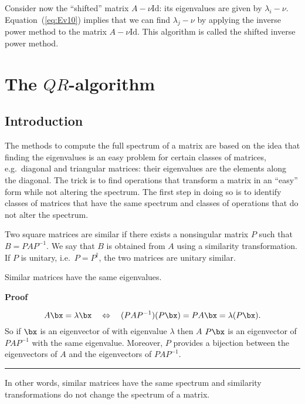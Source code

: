Consider now the ``shifted'' matrix $A - \nu \text{Id}$: its
eigenvalues are given by $\lambda_i - \nu$.  Equation~(\ref{eq:Ev10})
implies that we can find $\lambda_j - \nu$ by applying the inverse
power method to the matrix $A - \nu \text{Id}$.  This algorithm is
called the shifted inverse power method.

\section{The \texorpdfstring{$QR$}{QR}-algorithm}

\subsection{Introduction}

The methods to compute the full spectrum of a matrix are based on the
idea that finding the eigenvalues is an easy problem for certain
classes of matrices, e.g.\ diagonal and triangular matrices: their
eigenvalues are the elements along the diagonal.  The trick
is to find operations that transform a matrix in an ``easy'' form
while not altering the spectrum.    The first step in doing so is to
identify classes of matrices that have the same spectrum and classes
of operations that do not alter the spectrum.

\begin{definition}
Two square matrices are similar if there exists a nonsingular matrix
$P$ such that $B = P A P^{-1}$.   We say that $B$ is obtained from $A$
using a similarity transformation.   If $P$ is unitary, i.e.\ $P =
P^\dagger$, the two matrices are unitary similar.
\end{definition}

\begin{theorem}
  \label{thr:1}
  Similar matrices have the same eigenvalues.
\end{theorem}
\noindent
\textbf{Proof}

\begin{equation*}
  A \bx = \lambda \bx \quad \Leftrightarrow \quad
  (P A P^{-1}) (P \bx) = P A \bx = \lambda (P \bx).
\end{equation*}
So if $\bx$ is an eigenvector of with eigenvalue $\lambda$ then $A$ $P
\bx$ is an eigenvector of $P A P^{-1}$ with the same
eigenvalue. Moreover, $P$ provides a bijection between the
eigenvectors of $A$ and the eigenvectors of $P A P^{-1}$. \hfill
\rule{3mm}{3mm}

\noindent
In other words, similar matrices have the same spectrum and similarity
transformations do not change the spectrum of a matrix.

